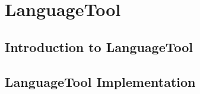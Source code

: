 \chapter{LanguageTool}
\label{language_tool}
\section{Introduction to LanguageTool}

\section{LanguageTool Implementation}